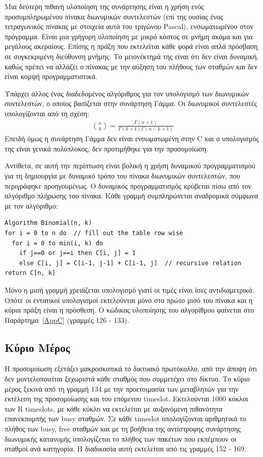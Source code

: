 \documentclass[12pt]{report}
\begin{document}
Μια δεύτερη πιθανή υλοποίηση της συνάρτησης είναι η χρήση ενός προσυμπληρωμένου πίνακα διωνυμικών συντελεστών (επί της ουσίας ένας τετραγωνικός πίνακας με στοιχεία αυτά του τριγώνου \textlatin{Pascal}), ενσωματωμένου στον πρόγραμμα. Είναι μια γρήγορη υλοποίηση με μικρό κόστος σε μνήμη ακόμα και για μεγάλους ακεραίους. Επίσης η πράξη που εκτελείται κάθε φορά είναι απλά πρόσβαση σε συγκεκριμένη διεύθυνση μνήμης. Το μειονέκτημά της είναι ότι δεν είναι δυναμική, καθώς πρέπει να αλλάζει ο πίνακας με την αύξηση του πλήθους των σταθμών και δεν είναι κομψή προγραμματιστικά.

Υπάρχει άλλος ένας διαδεδομένος αλγόριθμος για τον υπολογισμό των διωνυμικών συντελεστών, ο οποίος βασίζεται στην συνάρτηση Γάμμα. Οι διωνυμικοί συντελεστές υπολογίζονται από τη σχέση:
\begin{align*}
  \binom{n}{k}={\frac {\Gamma (n+1)}{\Gamma (k+1)\Gamma (n-k+1)}}
\end{align*}
Επειδή όμως η συνάρτηση Γάμμα δεν είναι ενσωματωμένη στην \textlatin{C} και ο υπολογισμός της είναι γενικά πολύπλοκος, δεν προτιμήθηκε για την προσομοίωση.

Αντίθετα, σε αυτή την περίπτωση είναι βολική η χρήση δυναμικού προγραμματισμού για τη δημιουργία με δυναμικό τρόπο του πίνακα διωνυμικών συντελεστών, που περιγράφηκε προηγουμένως. Ο δυναμικός προγραμματισμός κρύβεται πίσω από τον αλγόριθμο πλήρωσης του πίνακα. Κάθε γραμμή συμπληρώνεται αναδρομικά σύμφωνα με τον αλγόριθμο:
\scriptsize
\begin{verbatim}
Algorithm Binomial(n, k)
for i = 0 to n do  // fill out the table row wise
  for i = 0 to min(i, k) do
    if j==0 or j==i then C[i, j] = 1
    else C[i, j] = C[i-1, j-1] + C[i-1, j]  // recursive relation
return C[n, k]
\end{verbatim}
\normalsize
{}
Μόνο η μισή γραμμή χρειάζεται υπολογισμό γιατί οι τιμές είναι ίσες αντιδιαμετρικά. Οπότε οι εντατικοί υπολογισμοί εκτελούνται μόνο στο πρώτο μισό του πίνακα και η κύρια πράξη είναι η πρόσθεση. Ο κώδικας υλοποίησης του αλγορίθμου φαίνεται στο Παράρτημα~\ref{AppC} (γραμμές 126 - 133).

\subsection{Κύριο Μέρος}
Η προσομοίωση εξετάζει μακροσκοπικά το δικτυακό πρωτόκολλο, από την άποψη ότι δεν μοντελοποιείται ξεχωριστά κάθε σταθμός που συμμετέχει στο δίκτυο. Το κύριο μέρος ξεκινά από τη γραμμή 134 με την προετοιμασία των μεταβλητών για την εκτέλεση της προσομοίωσης και του επόμενου \textlatin{timeslot}. Εκτελούνται 1000 κύκλοι των \textlatin{R timeslots}, με κάθε κύκλο να εκτελείται με αυξανόμενη πιθανότητα επανεκπομπής των \textlatin{busy} σταθμών. Σε κάθε \textlatin{timeslot} υπολογίζονται αριθμητικά το πλήθος των \textlatin{busy, free} σταθμών και με τη βοήθεια της αντίστροφης συνάρτησης διωνυμικής κατανομής υπολογίζεται το πλήθος των πακέτων που εκπέμπουν οι σταθμοί ανά κατηγορία. Η διαδικασία αυτή εκτελείται από τις γραμμές 152 - 169.
\end{document}
